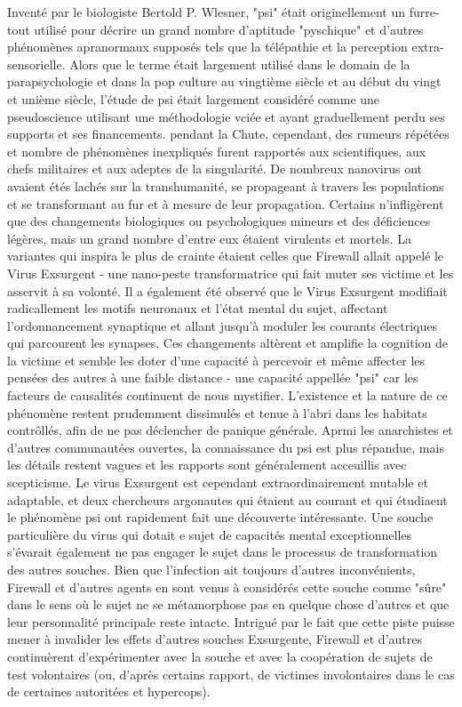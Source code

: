 Inventé par le biologiste Bertold P. Wlesner, "psi" était originellement un furre-tout utilisé pour décrire un grand nombre d'aptitude "pyschique" et d'autres phénomènes apranormaux supposés tels que la télépathie et la perception extra-sensorielle. Alors que le terme était largement utilisé dans le domain de la parapsychologie et dans la pop culture au vingtième siècle et au début du vingt et unième siècle, l'étude de psi était largement considéré comme une pseudoscience utilisant une méthodologie vciée et ayant graduellement perdu ses supports et ses financements. pendant la Chute, cependant, des rumeurs répétées et nombre de phénomènes inexpliqués furent rapportés aux scientifiques, aux chefs militaires et aux adeptes de la singularité. De nombreux nanovirus ont avaient étés lachés sur la transhumanité, se propageant à travers les populations et se transformant au fur et à mesure de leur propagation. Certains n'infligèrent que des changements biologiques ou psychologiques mineurs et des déficiences légères, mais un grand nombre d'entre eux étaient virulents et mortels. La variantes qui inspira le plus de crainte étaient celles que Firewall allait appelé le Virus Exsurgent - une nano-peste transformatrice qui fait muter ses victime et les asservit à sa volonté. Il a également été observé que le Virus Exsurgent modifiait radicallement les motifs neuronaux et l'état mental du sujet, affectant l'ordonnancement synaptique et allant jusqu'à moduler les courants électriques qui parcourent les synapses. Ces changements altèrent et amplifie la cognition de la victime et semble les doter d'une capacité à percevoir et même affecter les pensées des autres à une faible distance - une capacité appellée "psi" car les facteurs de causalités continuent de nous mystifier. L'existence et la nature de ce phénomène restent prudemment dissimulés et tenue à l'abri dans les habitats contrôllés, afin de ne pas déclencher de panique générale. Aprmi les anarchistes et d'autres communautées ouvertes, la connaissance du psi est plus répandue, mais les détails restent vagues et les rapports sont généralement acceuillis avec scepticisme. Le virus Exsurgent est cependant extraordinairement mutable et adaptable, et deux chercheurs argonautes qui étaient au courant et qui étudiaent le phénomène psi ont rapidement fait une découverte intéressante. Une souche particulière du virus qui dotait e sujet de capacités mental exceptionnelles s'évarait également ne pas engager le sujet dans le processus de transformation des autres souches. Bien que l'infection ait toujours d'autres inconvénients, Firewall et d'autres agents en sont venus à considérés cette souche comme "sûre" dans le sens où le sujet ne se métamorphose pas en quelque chose d'autres et que leur personnalité principale reste intacte. Intrigué par le fait que cette piste puisse mener à invalider les effets d'autres souches Exsurgente, Firewall et d'autres continuèrent d'expérimenter avec la souche et avec la coopération de sujets de test volontaires (ou, d'après certains rapport, de victimes involontaires dans le cas de certaines autoritées et hypercops). 

